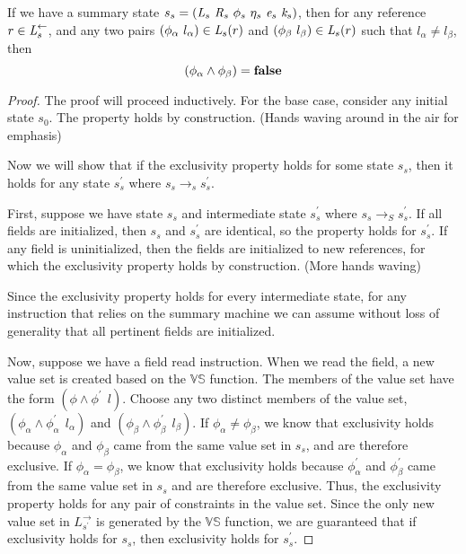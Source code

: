 \begin{theorem}
\label{thm:mutex}
If we have a summary state $s_s = ( \cfgnt{L}_s\ \cfgnt{R}_s\ \phi_s\ \eta_s\ \cfgnt{e}_s\ \cfgnt{k}_s )$, then for any reference $r \in \emph{L}_s^\leftarrow$, and any two pairs $(\phi_\alpha\ l_\alpha) \in \emph{L}_s(r)$ and $(\phi_\beta\ l_\beta) \in \emph{L}_s(r)$ such that $l_\alpha \ne l_\beta$, then
$$(\phi_\alpha \wedge \phi_\beta) = \textbf{false}$$
\end{theorem}
\begin{proof}
The proof will proceed inductively. For the base case, consider any initial state $s_0$. The property holds by construction. (Hands waving around in the air for emphasis)

Now we will show that if the exclusivity property holds for some state $s_s$, then it holds for any state $s_s^\prime$ where $s_s \rightarrow_s s_s^\prime$.

First, suppose we have state $s_s$ and intermediate state $s_s^\prime$ where $s_s \rightarrow_S s_s^\prime$. If all fields are initialized, then $s_s$ and $s_s^\prime$ are identical, so the property holds for $s_s^\prime$. If any field is uninitialized, then the fields are initialized to new references, for which the exclusivity property holds by construction. (More hands waving)

Since the exclusivity property holds for every intermediate state, for any instruction that relies on the summary machine we can assume without loss of generality that all pertinent fields are initialized.

Now, suppose we have a field read instruction. When we read the field, a new value set is created based on the $\mathbb{VS}$ function. The members of the value set have the form $(\phi\wedge \phi^\prime\ \ l)$. Choose any two distinct members of the value set, $(\phi_\alpha \wedge \phi_\alpha^\prime\ \ l_\alpha)$ and $(\phi_\beta \wedge \phi_\beta^\prime\ \ l_\beta)$. If $\phi_\alpha \ne \phi_\beta$, we know that exclusivity holds because $\phi_\alpha$ and $\phi_\beta$ came from the same value set in $s_s$, and are therefore exclusive. If $\phi_\alpha = \phi_\beta$, we know that exclusivity holds because $\phi_\alpha^\prime$ and $\phi_\beta^\prime$ came from the same value set in $s_s$ and are therefore exclusive. Thus, the exclusivity property holds for any pair of constraints in the value set. Since the only new value set in $L_{s^\prime}^\rightarrow$ is generated by the $\mathbb{VS}$ function, we are guaranteed that if exclusivity holds for $s_s$, then exclusivity holds for $s_s^\prime$.


\end{proof}
